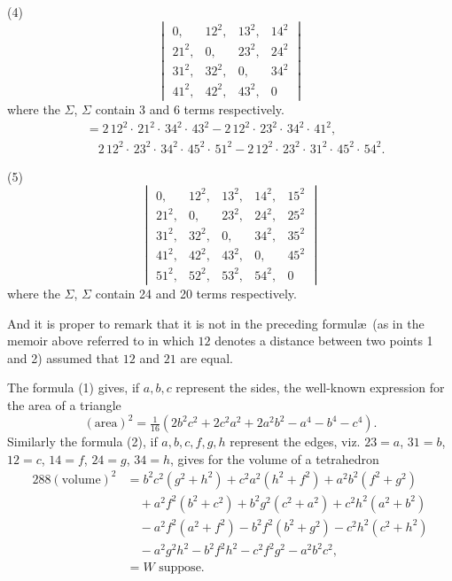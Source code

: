 \documentclass[11pt,a4paper]{book}
\begin{document}
(4)
\[
\begin{vmatrix}
0, & 12^2, & 13^2, & 14^2 \\
21^2, & 0, & 23^2, & 24^2 \\
31^2, & 32^2, & 0, & 34^2 \\
41^2, & 42^2, & 43^2, & 0
\end{vmatrix}
\]
where the $\Sigma$, $\Sigma$ contain 3 and 6 terms respectively.
\begin{align*}
&= 2\,12^2\cdot\,21^2\cdot\,34^2\cdot\,43^2 - 2\,12^2\cdot\,23^2\cdot\,34^2\cdot\,41^2,\\
&\quad 2\,12^2\cdot\,23^2\cdot\,34^2\cdot\,45^2\cdot\,51^2 - 2\,12^2\cdot\,23^2\cdot\,31^2\cdot\,45^2\cdot\,54^2.
\end{align*}

(5)
\[
\begin{vmatrix}
0, & 12^2, & 13^2, & 14^2, & 15^2 \\
21^2, & 0, & 23^2, & 24^2, & 25^2 \\
31^2, & 32^2, & 0, & 34^2, & 35^2 \\
41^2, & 42^2, & 43^2, & 0, & 45^2 \\
51^2, & 52^2, & 53^2, & 54^2, & 0
\end{vmatrix}
\]
where the $\Sigma$, $\Sigma$ contain 24 and 20 terms respectively.

And it is proper to remark that it is not in the preceding formul\ae\ (as in the memoir above referred to in which $12$ denotes a distance between two points 1 and 2) assumed that $12$ and $21$ are equal.

The formula (1) gives, if $a, b, c$ represent the sides, the well-known expression for the area of a triangle
\[
(\text{area})^2 = \tfrac{1}{16}(2b^2c^2 + 2c^2a^2 + 2a^2b^2 - a^4 - b^4 - c^4).
\]
Similarly the formula (2), if $a, b, c, f, g, h$ represent the edges, viz. $23 = a$, $31 = b$, $12 = c$, $14 = f$, $24 = g$, $34 = h$, gives for the volume of a tetrahedron
\begin{align*}
288(\text{volume})^2 &= b^2c^2(g^2 + h^2) + c^2a^2(h^2 + f^2) + a^2b^2(f^2 + g^2)\\
&\quad + a^2f^2(b^2 + c^2) + b^2g^2(c^2 + a^2) + c^2h^2(a^2 + b^2)\\
&\quad - a^2f^2(a^2 + f^2) - b^2f^2(b^2 + g^2) - c^2h^2(c^2 + h^2)\\
&\quad - a^2g^2h^2 - b^2f^2h^2 - c^2f^2g^2 - a^2b^2c^2,\\
&= W\text{ suppose}.
\end{align*}
\end{document}

